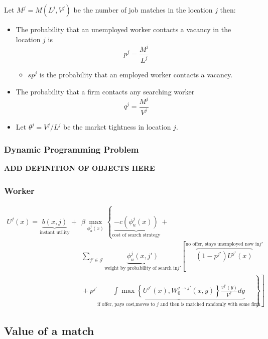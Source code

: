 \documentclass[
  letterpaper,
  DIV=11,
  numbers=noendperiod]{scrartcl}
\providecommand{\tightlist}{%
  \setlength{\itemsep}{0pt}\setlength{\parskip}{0pt}}\usepackage{longtable,booktabs,array}
\begin{document}
Let \(M^j = M(L^j, V^j)\) be the number of job matches in the location
\(j\) then:

\begin{itemize}
\tightlist
\item
  The probability that an unemployed worker contacts a vacancy in the
  location \(j\) is \[p^j = \frac{M^j}{L^j}\]

  \begin{itemize}
  \tightlist
  \item
    \(sp^j\) is the probability that an employed worker contacts a
    vacancy.
  \end{itemize}
\item
  The probability that a ﬁrm contacts any searching worker
  \[q^j = \frac{M^j}{V^j}\]
\item
  Let \(\theta^j = V^j / L^j\) be the market tightness in location
  \(j\).
\end{itemize}

\hypertarget{dynamic-programming-problem}{%
\subsubsection{Dynamic Programming
Problem}\label{dynamic-programming-problem}}

\textbf{ADD DEFINITION OF OBJECTS HERE}

\hypertarget{worker}{%
\subsubsection{Worker}\label{worker}}

\begin{align*}
U^{j}(x) = \underbrace{b(x,j)}_{\text{instant utility}} + &\beta\max_{\phi^j_u(x)}\left\{ \underbrace{-c(\phi^j_u(x))}_{\text{cost of search strategy}} \right.  + \\
& \sum_{j'\in \mathcal{J}} \underbrace{\phi^j_u(x, j')}_{\text{weight by probability of search in} j'}\left[ \overbrace{(1-p^{j'})U^{j'}(x)}^{\text{no offer, stays unemployed now in} j'} \right.  \\
& \left. \left. \hspace{0cm} + p^{j'} \underbrace{\int \max\left\{U^{j'}(x),W^{j\to j'}_{0}(x,y)\right\}\frac{v^{j'}(y)}{V^{j'}}dy}_{\text{if offer, pays cost,moves to } j \text{ and then is matched randomly with some firm}} \right] \right\} 
\end{align*}

\hypertarget{value-of-a-match}{%
\subsection{Value of a match}\label{value-of-a-match}}
\end{document}
